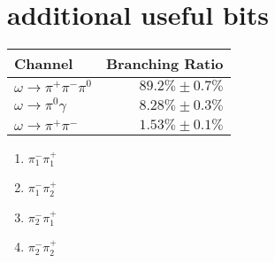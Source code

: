 \section{additional useful bits}

\begin{center}
 \begin{tabular}{|l|r|}
 	\hline
 	Channel & Branching Ratio  \\ \hline
 	$\omega \rightarrow \pi^+\pi^-\pi^0$ & $89.2\% \pm 0.7\%$ \\
 	$\omega \rightarrow \pi^0\gamma$ & $8.28\% \pm 0.3\%$ \\
 	$\omega \rightarrow \pi^+\pi^-$ & $1.53\% \pm 0.1\%$ \\
 	\hline
 \end{tabular}
 \end{center}
 
 \begin{enumerate}
 	\item $\pi^{-}_{1}\pi^{+}_{1}$
 	\item $\pi^{-}_{1}\pi^{+}_{2}$
 	\item $\pi^{-}_{2}\pi^{+}_{1}$
 	\item $\pi^{-}_{2}\pi^{+}_{2}$
 \end{enumerate}
 
 